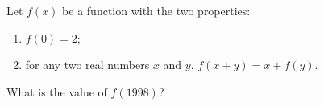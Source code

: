 Let $f(x)$ be a function with the two properties:
\begin{enumerate}
\item[(i)] $f(0)=2$;
\item[(ii)] for any two real numbers $x$ and $y$, $f(x+y)=x+f(y)$.
\end{enumerate}
What is the value of $f(1998)$?
